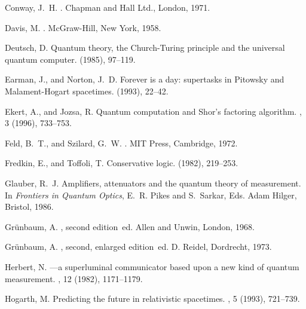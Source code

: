 \begin{thebibliography}{10}
{\sc Conway, J.~H.}
.
\newblock Chapman and Hall Ltd., London, 1971.

{\sc Davis, M.}
.
\newblock McGraw-Hill, New York, 1958.

{\sc Deutsch, D.}
\newblock Quantum theory, the {C}hurch-{T}uring principle and the universal
  quantum computer.
 (1985),
  97--119.

{\sc Earman, J., and Norton, J.~D.}
\newblock Forever is a day: supertasks in {P}itowsky and {M}alament-{H}ogart
  spacetimes.
 (1993), 22--42.

{\sc Ekert, A., and Jozsa, R.}
\newblock Quantum computation and {S}hor's factoring algorithm.
, 3 (1996), 733--753.

{\sc Feld, B.~T., and Szilard, G.~W.}
.
\newblock MIT Press, Cambridge, 1972.

{\sc Fredkin, E., and Toffoli, T.}
\newblock Conservative logic.
 (1982),
  219--253.

{\sc Glauber, R.~J.}
\newblock Amplifiers, attenuators and the quantum theory of measurement.
\newblock In {\em Frontiers in Quantum Optics}, E.~R. Pikes and S.~Sarkar, Eds.
  Adam Hilger, Bristol, 1986.

{\sc Gr{\"{u}}nbaum, A.}
, second edition~ed.
\newblock Allen and Unwin, London, 1968.

{\sc Gr{\"{u}}nbaum, A.}
, second, enlarged
  edition~ed.
\newblock D. Reidel, Dordrecht, 1973.

{\sc Herbert, N.}
---a superluminal communicator based upon a new kind of
  quantum measurement.
, 12 (1982), 1171--1179.

{\sc Hogarth, M.}
\newblock Predicting the future in relativistic spacetimes.
, 5 (1993), 721--739.


\end{thebibliography}
